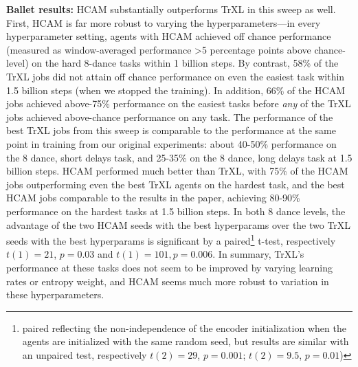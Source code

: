 \textbf{Ballet results:} HCAM substantially outperforms TrXL in this sweep as well. First, HCAM is far more robust to varying the hyperparameters—in every hyperparameter setting, agents with HCAM achieved off chance performance (measured as window-averaged performance >5 percentage points above chance-level) on the hard 8-dance tasks within 1 billion steps. By contrast, 58\% of the TrXL jobs did not attain off chance performance on even the easiest task within 1.5 billion steps (when we stopped the training). In addition, 66\% of the HCAM jobs achieved above-75\% performance on the easiest tasks before \emph{any} of the TrXL jobs achieved above-chance performance on any task. The performance of the best TrXL jobs from this sweep is comparable to the performance at the same point in training from our original experiments: about 40-50\% performance on the 8 dance, short delays task, and 25-35\% on the 8 dance, long delays task at 1.5 billion steps. HCAM performed much better than TrXL, with 75\% of the HCAM jobs outperforming even the best TrXL agents on the hardest task, and the best HCAM jobs comparable to the results in the paper, achieving 80-90\% performance on the hardest tasks at 1.5 billion steps. In both 8 dance levels, the advantage of the two HCAM seeds with the best hyperparams over the two TrXL seeds with the best hyperparams is significant by a paired\footnote{paired reflecting the non-independence of the encoder initialization when the agents are initialized with the same random seed, but results are similar with an unpaired test, respectively \(t(2)=29\), \(p=0.001\); \(t(2)=9.5\), \(p=0.01\))} t-test, respectively \(t(1)=21\), \(p=0.03\) and \(t(1) = 101, p=0.006\). In summary, TrXL’s performance at these tasks does not seem to be improved by varying learning rates or entropy weight, and HCAM seems much more robust to variation in these hyperparameters.

